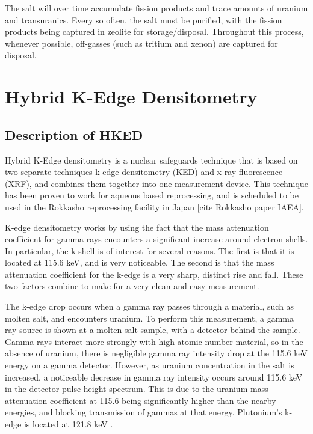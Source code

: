 The salt will over time accumulate fission products and trace amounts of uranium and transuranics. Every so often, the salt must be purified, with the fission products being captured in zeolite for storage/disposal. Throughout this process, whenever possible, off-gasses (such as tritium and xenon) are captured for disposal. 

\section{Hybrid K-Edge Densitometry}

\subsection{Description of HKED}

Hybrid K-Edge densitometry is a nuclear safeguards technique that is based on two separate techniques k-edge densitometry (KED) and x-ray fluorescence (XRF), and combines them together into one measurement device. This technique has been proven to work for aqueous based reprocessing, and is scheduled to be used in the Rokkasho reprocessing facility in Japan [cite Rokkasho paper IAEA]. 

K-edge densitometry works by using the fact that the mass attenuation coefficient for gamma rays encounters a significant increase around electron shells. In particular, the k-shell is of interest for several reasons. The first is that it is located at 115.6 keV, and is very noticeable. The second is that the mass attenuation coefficient for the k-edge is a very sharp, distinct rise and fall. These two factors combine to make for a very clean and easy measurement. 

The k-edge drop occurs when a gamma ray passes through a material, such as molten salt, and encounters uranium. To perform this measurement, a gamma ray source is shown at a molten salt sample, with a detector behind the sample. Gamma rays interact more strongly with high atomic number material, so in the absence of uranium, there is negligible gamma ray intensity drop at the 115.6 keV energy on a gamma detector. However, as uranium concentration in the salt is increased, a noticeable decrease in gamma ray intensity occurs around 115.6 keV in the detector pulse height spectrum. This is due to the uranium mass attenuation coefficient at 115.6 being significantly higher than the nearby energies, and blocking transmission of gammas at that energy. Plutonium's k-edge is located at 121.8 keV \cite{Gavron1996}.

